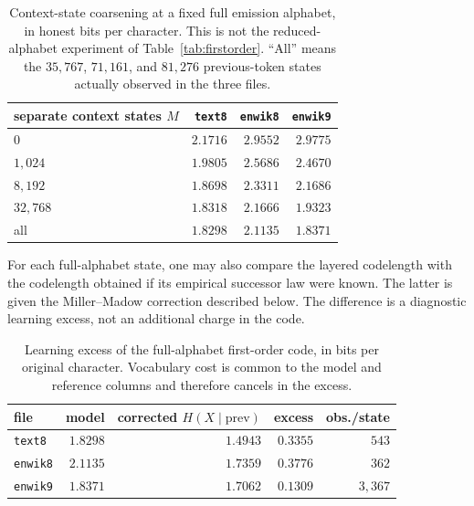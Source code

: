 \documentclass[11pt]{article}
\begin{document}
\begin{table}[ht]
\centering
\begin{tabular}{lrrr}
\toprule
separate context states $M$ & \texttt{text8} & \texttt{enwik8} & \texttt{enwik9} \\
\midrule
$0$        & $2.1716$ & $2.9552$ & $2.9775$ \\
$1{,}024$  & $1.9805$ & $2.5686$ & $2.4670$ \\
$8{,}192$  & $1.8698$ & $2.3311$ & $2.1686$ \\
$32{,}768$ & $1.8318$ & $2.1666$ & $1.9323$ \\
all        & $1.8298$ & $2.1135$ & $1.8371$ \\
\bottomrule
\end{tabular}
\caption{Context-state coarsening at a fixed full emission alphabet, in
  honest bits per character.  This is not the reduced-alphabet experiment of
  Table~\ref{tab:firstorder}.  ``All'' means the $35{,}767$, $71{,}161$, and
  $81{,}276$ previous-token states actually observed in the three files.}
\label{tab:coarsen}
\end{table}

For each full-alphabet state, one may also compare the layered codelength with
the codelength obtained if its empirical successor law were known.  The latter
is given the Miller--Madow correction described below.  The difference is a
diagnostic learning excess, not an additional charge in the code.

\begin{table}[ht]
\centering
\begin{tabular}{lrrrr}
\toprule
file & model & corrected $H(X\mid\mathrm{prev})$ & excess & obs./state \\
\midrule
\texttt{text8}  & $1.8298$ & $1.4943$ & $0.3355$ & $543$ \\
\texttt{enwik8} & $2.1135$ & $1.7359$ & $0.3776$ & $362$ \\
\texttt{enwik9} & $1.8371$ & $1.7062$ & $0.1309$ & $3{,}367$ \\
\bottomrule
\end{tabular}
\caption{Learning excess of the full-alphabet first-order code, in bits per
  original character.  Vocabulary cost is common to the model and reference
  columns and therefore cancels in the excess.}
\label{tab:excess}
\end{table}
\end{document}
